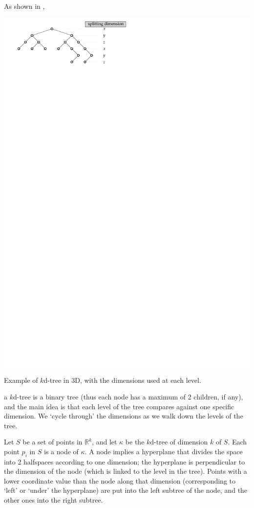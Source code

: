As shown in ,
\begin{marginfigure}
  \centering
  \includegraphics[width=\linewidth]{figs/kdtree}
  \caption{Example of $k$d-tree in 3D, with the dimensions used at each level.}%
\end{marginfigure} 
a $k$d-tree is a binary tree (thus each node has a maximum of 2 children, if any), and the main idea is that each level of the tree compares against one specific dimension.
We `cycle through' the dimensions as we walk down the levels of the tree.

%

Let $S$ be a set of points in $\mathbb{R}^k$, and let $\kappa$ be the $k$d-tree of dimension $k$ of $S$.
Each point $p_i$ in $S$ is a node of $\kappa$.
A node implies a hyperplane that divides the space into 2 halfspaces according to one dimension; the hyperplane is perpendicular to the dimension of the node (which is linked to the level in the tree).
Points with a lower coordinate value than the node along that dimension (corresponding to `left' or `under' the hyperplane) are put into the left subtree of the node, and the other ones into the right subtree.

